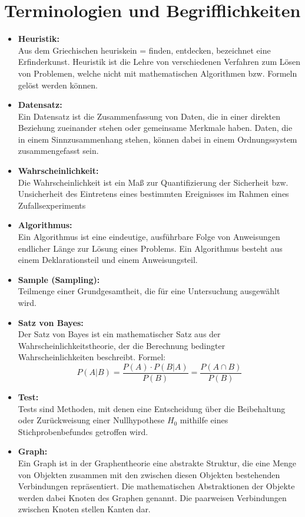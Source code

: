 \section{Terminologien und Begrifflichkeiten}
\begin{itemize}
	\item \textbf{Heuristik:}\\ Aus dem Griechischen heuriskein = finden, entdecken, bezeichnet eine Erfinderkunst. Heuristik ist die Lehre von verschiedenen Verfahren zum Lösen von Problemen, welche nicht mit mathematischen Algorithmen bzw. Formeln gelöst werden können.
\item \textbf{Datensatz:}\\ Ein Datensatz ist die Zusammenfassung von Daten, die in einer direkten Beziehung zueinander stehen oder gemeinsame Merkmale haben. Daten, die in einem Sinnzusammenhang stehen, können dabei in einem Ordnungssystem zusammengefasst sein.
\item \textbf{Wahrscheinlichkeit:}\\ Die Wahrscheinlichkeit ist ein Maß zur Quantifizierung der Sicherheit bzw. Unsicherheit des Eintretens eines bestimmten Ereignisses im Rahmen eines Zufallsexperiments
\item \textbf{Algorithmus:}\\Ein Algorithmus ist eine eindeutige, ausführbare Folge von Anweisungen endlicher Länge zur Lösung eines Problems. Ein Algorithmus besteht aus einem Deklarationsteil und einem Anweisungsteil.
\item \textbf{Sample (Sampling):}\\Teilmenge einer Grundgesamtheit, die für eine Untersuchung ausgewählt wird.
\item \textbf{Satz von Bayes:}\\Der Satz von Bayes ist ein mathematischer Satz aus der Wahrscheinlichkeitstheorie, der die Berechnung bedingter Wahrscheinlichkeiten beschreibt. Formel: \[P(A|B)=\frac{P(A)\cdot P(B|A)}{P(B)}=\frac{P(A\cap B)}{P(B)}\]
\item \textbf{Test:}\\ Tests sind Methoden, mit denen eine Entscheidung über die Beibehaltung oder Zurückweisung einer Nullhypothese \(H_0\) mithilfe eines Stichprobenbefundes getroffen wird.
\item \textbf{Graph:}\\Ein Graph ist in der Graphentheorie eine abstrakte Struktur, die eine Menge von Objekten zusammen mit den zwischen diesen Objekten bestehenden Verbindungen repräsentiert. Die mathematischen Abstraktionen der Objekte werden dabei Knoten des Graphen genannt. Die paarweisen Verbindungen zwischen Knoten stellen Kanten dar.

\end{itemize}
